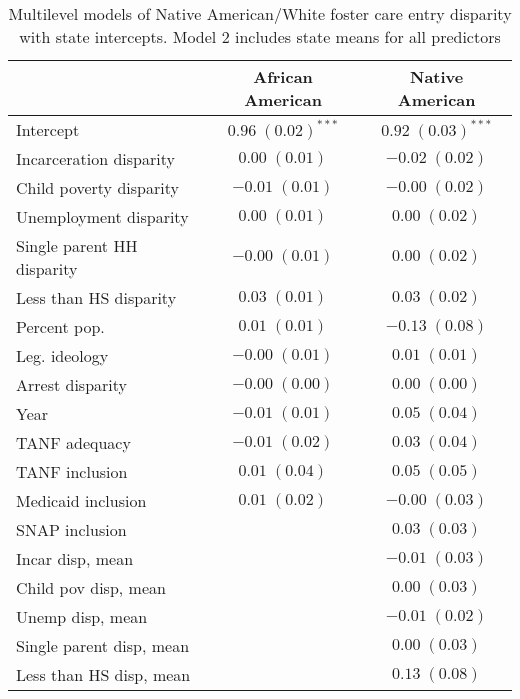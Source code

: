 
\begin{table}
\caption{Multilevel models of Native American/White foster care entry disparity with state intercepts. Model 2 includes state means for all predictors }
\begin{center}
\begin{tabular}{l c c }
\hline
 & African American & Native American \\
\hline
Intercept                  & $0.96 \; (0.02)^{***}$ & $0.92 \; (0.03)^{***}$ \\
Incarceration disparity    & $0.00 \; (0.01)$       & $-0.02 \; (0.02)$      \\
Child poverty disparity    & $-0.01 \; (0.01)$      & $-0.00 \; (0.02)$      \\
Unemployment disparity     & $0.00 \; (0.01)$       & $0.00 \; (0.02)$       \\
Single parent HH disparity & $-0.00 \; (0.01)$      & $0.00 \; (0.02)$       \\
Less than HS disparity     & $0.03 \; (0.01)$       & $0.03 \; (0.02)$       \\
Percent pop.               & $0.01 \; (0.01)$       & $-0.13 \; (0.08)$      \\
Leg. ideology              & $-0.00 \; (0.01)$      & $0.01 \; (0.01)$       \\
Arrest disparity           & $-0.00 \; (0.00)$      & $0.00 \; (0.00)$       \\
Year                       & $-0.01 \; (0.01)$      & $0.05 \; (0.04)$       \\
TANF adequacy              & $-0.01 \; (0.02)$      & $0.03 \; (0.04)$       \\
TANF inclusion             & $0.01 \; (0.04)$       & $0.05 \; (0.05)$       \\
Medicaid inclusion         & $0.01 \; (0.02)$       & $-0.00 \; (0.03)$      \\
SNAP inclusion             &                        & $0.03 \; (0.03)$       \\
Incar disp, mean           &                        & $-0.01 \; (0.03)$      \\
Child pov disp, mean       &                        & $0.00 \; (0.03)$       \\
Unemp disp, mean           &                        & $-0.01 \; (0.02)$      \\
Single parent disp, mean   &                        & $0.00 \; (0.03)$       \\
Less than HS disp, mean    &                        & $0.13 \; (0.08)$       \\

\end{tabular}
\end{center}
\end{table}
